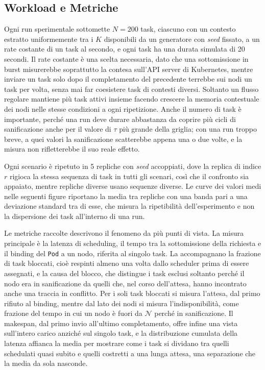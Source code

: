 \subsection{Workload e Metriche}
\label{subsec:workload_metriche}

Ogni run sperimentale sottomette $N = 200$ task, ciascuno con un contesto estratto uniformemente tra i $K$ disponibili da un generatore con \emph{seed} fissato, a un rate costante di un task al secondo, e ogni task ha una durata simulata di 20 secondi. Il rate costante è una scelta necessaria, dato che una sottomissione in burst misurerebbe soprattutto la contesa sull'API server di Kubernetes, mentre inviare un task solo dopo il completamento del precedente terrebbe sui nodi un task per volta, senza mai far coesistere task di contesti diversi. Soltanto un flusso regolare mantiene più task attivi insieme facendo crescere la memoria contestuale dei nodi nelle stesse condizioni a ogni ripetizione. Anche il numero di task è importante, perché una run deve durare abbastanza da coprire più cicli di sanificazione anche per il valore di $\tau$ più grande della griglia; con una run troppo breve, a quei valori la sanificazione scatterebbe appena una o due volte, e la misura non rifletterebbe il suo reale effetto.

Ogni scenario è ripetuto in 5 repliche con \emph{seed} accoppiati, dove la replica di indice $r$ rigioca la stessa sequenza di task in tutti gli scenari, così che il confronto sia appaiato, mentre repliche diverse usano sequenze diverse. Le curve dei valori medi nelle seguenti figure riportano la media tra repliche con una banda pari a una deviazione standard tra di esse, che misura la ripetibilità dell'esperimento e non la dispersione dei task all'interno di una run.

Le metriche raccolte descrivono il fenomeno da più punti di vista. La misura principale è la latenza di scheduling, il tempo tra la sottomissione della richiesta e il binding del \texttt{Pod} a un nodo, riferita al singolo task. La accompagnano la frazione di task bloccati, cioè respinti almeno una volta dallo scheduler prima di essere assegnati, e la causa del blocco, che distingue i task esclusi soltanto perché il nodo era in sanificazione da quelli che, nel corso dell'attesa, hanno incontrato anche una traccia in conflitto. Per i soli task bloccati si misura l'attesa, dal primo rifiuto al binding, mentre dal lato dei nodi si misura l'indisponibilità, come frazione del tempo in cui un nodo è fuori da $\mathcal{N}$ perché in sanificazione. Il makespan, dal primo invio all'ultimo completamento, offre infine una vista sull'intero carico anziché sul singolo task, e la distribuzione cumulata della latenza affianca la media per mostrare come i task si dividano tra quelli schedulati quasi subito e quelli costretti a una lunga attesa, una separazione che la media da sola nasconde.

